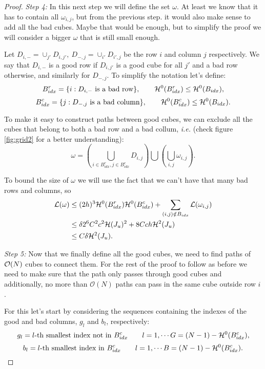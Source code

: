 \begin{proof}
    \textit{Step 4:} In this next step  we will  define the set $\omega$. At least we know that it has to contain all $\omega_{i,j}$, but from the previous step. it would also make sense to add all the bad cubes. Maybe that would be enough, but to simplify the proof we will consider a bigger $\omega$ that is still small enough.
    
    Let $D_{i,-}=\cup_{j'} D_{i,j'},\  D_{-,j}={\cup_{i'}D_{i',j}}$ be the row $i$ and column $j$ respectively. We say that $D_{i,-}$ is a good row if $D_{i,j'}$ is a good cube for all $j'$ and a bad row otherwise, and similarly for $D_{-,j}$. To simplify the notation let's define:
    $$B^r_{idx}=\{i: D_{i,-}\text{ is a bad row}\}, \qquad {\mathcal H}^0(B^r_{idx})\leq {\mathcal H}^0(B_{idx}), $$
    $$B^c_{idx}=\{j: D_{-,j}\text{ is a bad column}\},\qquad {\mathcal H}^0(B^c_{idx})\leq {\mathcal H}^0(B_{idx}).  $$
    
    To make it easy to construct paths between good cubes,  we can exclude all the cubes that belong to both a bad row and a bad collum, \textit{i.e.} (check  figure \ref{fig:grid2} for a better understanding):
    $$\omega = \left(\bigcup_{i\in B^r_{idx},j\in B^c_{idx}}D_{i,j}\right)\bigcup \left(\bigcup_{i,j} \omega_{i,j}\right).$$
    
    To bound the size of $\omega$ we will use the fact that we can't have that many bad rows and columns, so
    \begin{align*}
        {\mathcal L}(\omega)&\leq (2h)^3{\mathcal H}^0(B^r_{idx}){\mathcal H}^0(B^c_{idx})+ \sum_{(i,j)\notin B_{idx}} {\mathcal L}(\omega_{i,j})\\
        &\leq \delta 2^6 C^2 c^2{\mathcal H}(J_u)^2 + 8Cch{\mathcal H}^2(J_u)\\
        &\leq C \delta {\mathcal H}^2(J_u).
    \end{align*}
   
    
    \textit{Step 5:} Now that we finally define all the good cubes, we need to find paths of ${\mathcal O}(N)$  cubes to connect them. For the rest of the proof to follow as before we need to make sure that the path only passes through good cubes and additionally, no more than $\mathcal{O}(N)$ paths can pass in the same cube outside row $i$.

    For this let's start by considering  the sequences containing the indexes of the good and bad columns, $g_l$ and $b_l$, respectively:
    $$g_l = l\text{-th smallest index not in }  B^c_{idx}\qquad l=1,\cdots G=(N-1)-{\mathcal H}^0(B^c_{idx}),$$
    $$b_l = l\text{-th smallest index in }  B^c_{idx}\qquad l=1,\cdots B=(N-1)-{\mathcal H}^0(B^c_{idx}).$$
    

\end{proof}
